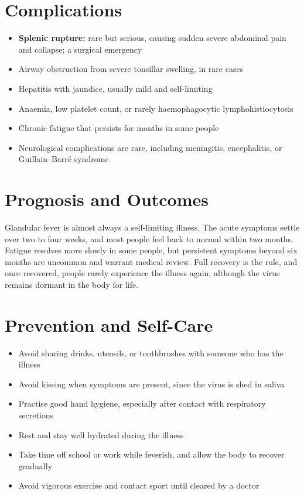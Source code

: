 \section*{Complications}
\begin{itemize}
    \item \textbf{Splenic rupture:} rare but serious, causing sudden severe abdominal pain and collapse; a surgical emergency
    \item Airway obstruction from severe tonsillar swelling, in rare cases
    \item Hepatitis with jaundice, usually mild and self-limiting
    \item Anaemia, low platelet count, or rarely haemophagocytic lymphohistiocytosis
    \item Chronic fatigue that persists for months in some people
    \item Neurological complications are rare, including meningitis, encephalitis, or Guillain--Barré syndrome
\end{itemize}

\section*{Prognosis and Outcomes}
Glandular fever is almost always a self-limiting illness. The acute symptoms settle over two to four weeks, and most people feel back to normal within two months. Fatigue resolves more slowly in some people, but persistent symptoms beyond six months are uncommon and warrant medical review. Full recovery is the rule, and once recovered, people rarely experience the illness again, although the virus remains dormant in the body for life.

\section*{Prevention and Self-Care}
\begin{itemize}
    \item Avoid sharing drinks, utensils, or toothbrushes with someone who has the illness
    \item Avoid kissing when symptoms are present, since the virus is shed in saliva
    \item Practise good hand hygiene, especially after contact with respiratory secretions
    \item Rest and stay well hydrated during the illness
    \item Take time off school or work while feverish, and allow the body to recover gradually
    \item Avoid vigorous exercise and contact sport until cleared by a doctor
\end{itemize}

